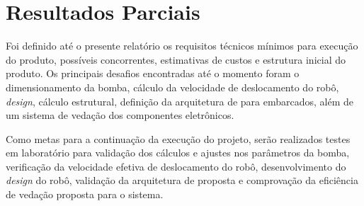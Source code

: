 \chapter{Resultados Parciais}
Foi definido até o presente relatório os requisitos técnicos mínimos para execução
do produto, possíveis concorrentes, estimativas de custos e estrutura inicial do
produto. Os principais desafios encontradas até o momento foram o dimensionamento
da bomba, cálculo da velocidade de deslocamento do robô, \textit{design}, cálculo
estrutural, definição da arquitetura de \software para embarcados, além de um
sistema de vedação dos componentes eletrônicos.
\par Como metas para a continuação da execução do projeto, serão realizados testes
em laboratório para validação dos cálculos e ajustes nos parâmetros da bomba,
verificação da velocidade efetiva de deslocamento do robô, desenvolvimento do
\textit{design} do robô, validação da arquitetura de \software proposta e
comprovação da eficiência de vedação proposta para o sistema.
